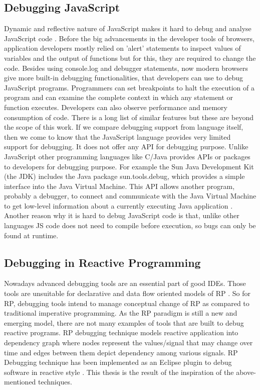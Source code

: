 \subsection{Debugging JavaScript}
Dynamic and reflective nature of JavaScript makes it hard to debug and analyse JavaScript code \cite{Richards:2010:ADB:1809028.1806598, Schafer:2012:RTD:2328876.2328885}. Before the big advancements in the developer tools of browsers, application developers mostly relied on 'alert' statements to inspect values of variables and the output of functions but for this, they are required to change the code. Besides using console.log and debugger statements, now modern browsers give more built-in debugging functionalities, that developers can use to debug JavaScript programs. Programmers can set breakpoints to halt the execution of a program and can examine the complete context in which any statement or function executes. Developers can also observe performance and memory consumption of code. There is a long list of similar features but these are beyond the scope of this work.
If we compare debugging support from language itself, then we come to know that the JavaScript language provides very limited support for debugging. It does not offer any API for debugging purpose. Unlike JavaScript other programming languages like C/Java provides APIs or packages to developers for debugging purpose. For example the Sun Java Development Kit (the JDK) includes the Java package sun.tools.debug, which provides a simple interface into the Java Virtual Machine. This API allows another program, probably a debugger, to connect and communicate with the Java Virtual Machine to get low-level information about a currently executing Java application \cite{vanderburg1996tricks}. Another reason why it is hard to debug JavaScript code is that, unlike other languages JS code does not need to compile before execution, so bugs can only be found at runtime.

\subsection{Debugging in Reactive Programming}
Nowadays advanced debugging tools are an essential part of good IDEs. Those tools are unsuitable for declarative and data flow oriented models of RP \cite{Salvaneschi:2016:DRP:2884781.2884815}.
So for RP, debugging tools intend to manage conceptual change of RP as compared to traditional imperative programming. As the RP paradigm is still a new and emerging model, there are not many examples of tools that are built to debug reactive programs. 
RP debugging technique models reactive application into dependency graph where nodes represent the values/signal that may change over time and edges between them depict dependency among various signals. RP Debugging technique has been implemented as an Eclipse plugin to debug software in reactive style \cite{Salvaneschi:2016:DRP:2884781.2884815}. This thesis is the result of the inspiration of the above-mentioned techniques. 

